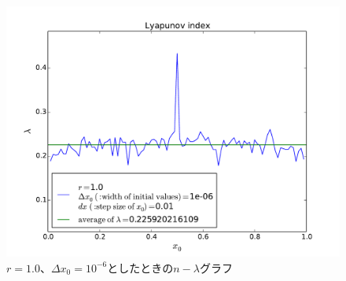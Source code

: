 \documentclass{jsarticle}
\begin{document}
\begin{enumerate}
\begin{enumerate}
                \begin{figure}[H]   
                    \begin{center}
                        \includegraphics[width=12.5cm]{figure_8.pdf}
                        \caption{$r=1.0$、$\Delta x_{0}=10^{-6}$としたときの$n - \lambda$グラフ}
                        \label{fig:f5}
                    \end{center}
                \end{figure}
                

\end{enumerate}
\end{enumerate}
\end{document}
